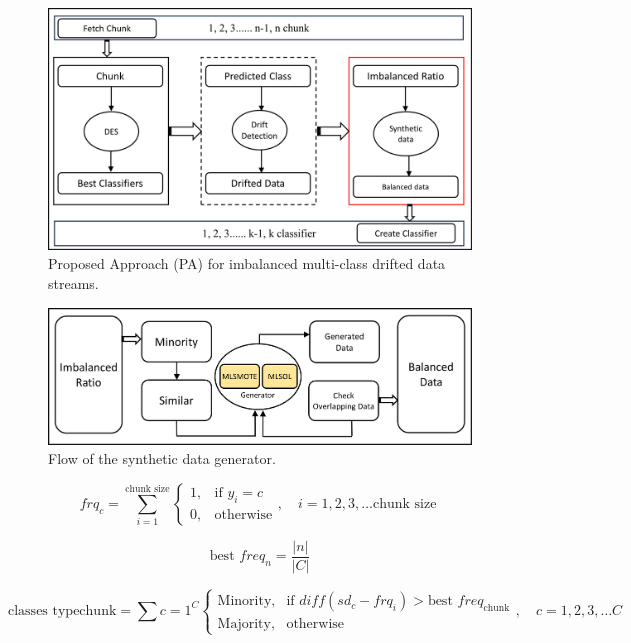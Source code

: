 \begin{figure}[!ht]
	\centering
	\includegraphics[width=1\linewidth]{4_Imbalanced/figures/approach_step_1.png}
	\caption{Proposed Approach (PA) for imbalanced multi-class drifted data streams.}
	\label{fig:4_first_proposal_step_1}
\end{figure}
\begin{figure}[!ht]
	\centering
	\includegraphics[width=1\linewidth]{4_Imbalanced/figures/approach_step_2.png}
	\caption{Flow of the synthetic data generator.}
	\label{fig:4_first_proposal_step_2}
\end{figure}

\begin{equation}
	\label{eq:4_first_proposal_1}
    frq_{c} = \sum_{i=1}^{\text{chunk size}} \begin{cases} 
    1, & \text{if } y_i = c \\
    0, & \text{otherwise}
    \end{cases}, \quad i = 1, 2, 3, \dots \text{chunk size}\;
\end{equation}

\begin{equation}
	\label{eq:4_first_proposal_2}
    \text{best } freq_{n} = \frac{|n|}{|C|}
\end{equation}

\begin{equation}
	\label{eq:4_first_proposal_3}
    \text{classes type}{\text{chunk}} = \sum{c=1}^{C} \begin{cases} 
    \text{Minority,} & \text{if } diff(sd_c - frq_i) > \text{best } freq_{\text{chunk}} \\
    \text{Majority,} & \text{otherwise}
    \end{cases}, \quad c = 1, 2, 3, \dots C
\end{equation}


